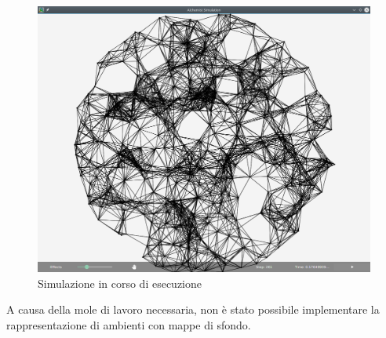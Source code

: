                \begin{figure}[htbp]
                    \centering
                    \includegraphics[scale=0.44]{img/withNodes/simWithNodes}
                    \caption{Simulazione in corso di esecuzione}
                    \label{fig:simWithNodes}
                \end{figure}

                A causa della mole di lavoro necessaria, non è stato possibile implementare la rappresentazione di ambienti con mappe di sfondo.
